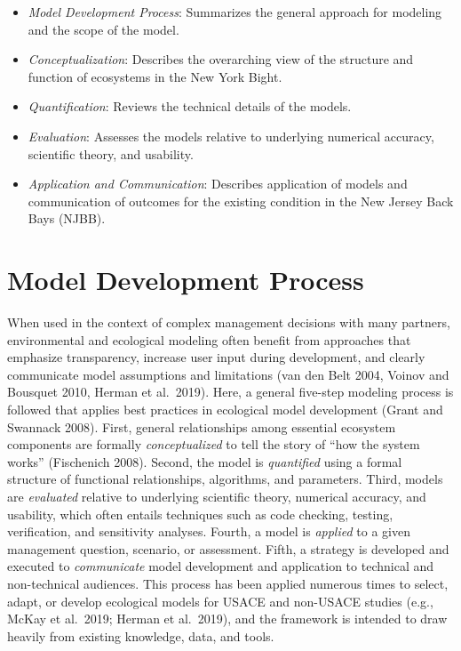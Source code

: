 \documentclass[
]{book}
\begin{document}
\begin{itemize}
\item
  \emph{Model Development Process}: Summarizes the general approach for modeling and the scope of the model.
\item
  \emph{Conceptualization}: Describes the overarching view of the structure and function of ecosystems in the New York Bight.
\item
  \emph{Quantification}: Reviews the technical details of the models.
\item
  \emph{Evaluation}: Assesses the models relative to underlying numerical accuracy, scientific theory, and usability.
\item
  \emph{Application and Communication}: Describes application of models and communication of outcomes for the existing condition in the New Jersey Back Bays (NJBB).
\end{itemize}

\hypertarget{model-development-process}{%
\chapter{Model Development Process}\label{model-development-process}}

When used in the context of complex management decisions with many partners, environmental and ecological modeling often benefit from approaches that emphasize transparency, increase user input during development, and clearly communicate model assumptions and limitations (van den Belt 2004, Voinov and Bousquet 2010, Herman et al.~2019). Here, a general five-step modeling process is followed that applies best practices in ecological model development (Grant and Swannack 2008). First, general relationships among essential ecosystem components are formally \emph{conceptualized} to tell the story of ``how the system works'' (Fischenich 2008). Second, the model is \emph{quantified} using a formal structure of functional relationships, algorithms, and parameters. Third, models are \emph{evaluated} relative to underlying scientific theory, numerical accuracy, and usability, which often entails techniques such as code checking, testing, verification, and sensitivity analyses. Fourth, a model is \emph{applied} to a given management question, scenario, or assessment. Fifth, a strategy is developed and executed to \emph{communicate} model development and application to technical and non-technical audiences. This process has been applied numerous times to select, adapt, or develop ecological models for USACE and non-USACE studies (e.g., McKay et al.~2019; Herman et al.~2019), and the framework is intended to draw heavily from existing knowledge, data, and tools.
\end{document}
